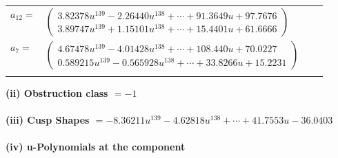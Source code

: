 \documentclass[1p]{elsarticle_modified}
\theoremstyle{definition}
\begin{document}
\begin{tabular}{m{7pt} m{180pt} m{7pt} m{180pt} }
\flushright $a_{12}=$&$\begin{pmatrix}3.82378 u^{139}-2.26440 u^{138}+\cdots+91.3649 u+97.7676\\3.89747 u^{139}+1.15101 u^{138}+\cdots+15.4401 u+61.6666\end{pmatrix}$ \\
\flushright $a_{7}=$&$\begin{pmatrix}4.67478 u^{139}-4.01428 u^{138}+\cdots+108.440 u+70.0227\\0.589215 u^{139}-0.565928 u^{138}+\cdots+33.8266 u+15.2231\end{pmatrix}$\\&\end{tabular}
\flushleft \textbf{(ii) Obstruction class $= -1$}\\~\\
\flushleft \textbf{(iii) Cusp Shapes $= -8.36211 u^{139}-4.62818 u^{138}+\cdots+41.7553 u-36.0403$}\\~\\
\newpage\renewcommand{\arraystretch}{1}
\flushleft \textbf{(iv) u-Polynomials at the component}\newline \\
\end{document}
